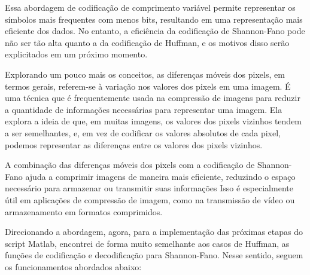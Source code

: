 \documentclass{article}
\begin{document}
Essa abordagem de codificação de comprimento variável permite representar os símbolos mais frequentes com menos bits, resultando em uma representação mais eficiente dos dados. No entanto, a eficiência da codificação de Shannon-Fano pode não ser tão alta quanto a da codificação de Huffman, e os motivos disso serão explicitados em um próximo momento.

Explorando um pouco mais os conceitos, as diferenças móveis dos pixels, em termos gerais, referem-se à variação nos valores dos pixels em uma imagem. É uma técnica que é frequentemente usada na compressão de imagens para reduzir a quantidade de informações necessárias para representar uma imagem. Ela explora a ideia de que, em muitas imagens, os valores dos pixels vizinhos tendem a ser semelhantes, e, em vez de codificar os valores absolutos de cada pixel, podemos representar as diferenças entre os valores dos pixels vizinhos. 

A combinação das diferenças móveis dos pixels com a codificação de Shannon-Fano ajuda a comprimir imagens de maneira mais eficiente, reduzindo o espaço necessário para armazenar ou transmitir suas informações Isso é especialmente útil em aplicações de compressão de imagem, como na transmissão de vídeo ou armazenamento em formatos comprimidos.

Direcionando a abordagem, agora, para a implementação das próximas etapas do script Matlab, encontrei de forma muito semelhante aos casos de Huffman, as funções de codificação e decodificação para Shannon-Fano. Nesse sentido, seguem os  funcionamentos abordados abaixo:
\end{document}
